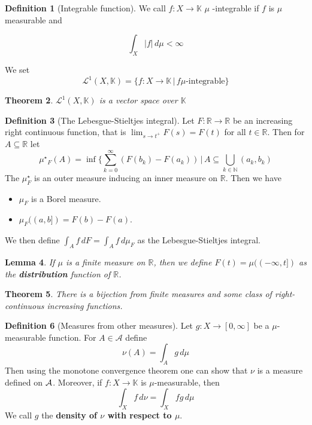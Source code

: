 \documentclass[10pt, oneside, reqno]{amsart}
\theoremstyle{plain}%
\newtheorem{thm}{Theorem}[section]
\newtheorem{lem}[thm]{Lemma}
\theoremstyle{definition}
\newtheorem{defn}[thm]{Definition}
\theoremstyle{remark}
\newcommand{\R}{\mathbb{R}}
\newcommand{\dmu}{\, d \mu}
\begin{document}
\begin{defn}[Integrable function]
	We call $f : X \rightarrow \mathbb{K}$ $\mu$ -integrable if $f$ is $\mu$ measurable and 
	
	\[
		\int_X |f| \, d \mu < \infty
	\]
	
	We set \[
		\mathcal{L}^1(X,\mathbb{K}) = \{ f : X \rightarrow \mathbb{K} \, | \, f \mu \text{-integrable} \}
	\]
\end{defn}

\begin{thm}
	$	\mathcal{L}^1(X,\mathbb{K})$ is a vector space over $\mathbb{K}$
\end{thm}


\begin{defn}[The Lebesgue-Stieltjes integral]
Let $F : \R \rightarrow \R$ be an increasing right continuous function, that is $\lim_{s \rightarrow t^+} F(s) = F(t)$ for all $t \in \R$.  Then for $A \subseteq \R$ let \[
	\mu{^\star}_F (A) = \inf \{ \sum_{k=0}^\infty (F(b_k) - F(a_k)) \, | \, A \subseteq \bigcup_{k \in \mathbb{N}} (a_k, b_k)
\]
The $\mu^\star_F$ is an outer measure inducing an inner measure on $\R$.  Then we have 
	\begin{itemize}
		\item $\mu_F$ is a Borel measure.
		\item $\mu_F((a,b]) = F(b) - F(a)$.
	\end{itemize}
	
	We then define $\int_A f \, dF = \int_A f \, d \mu_F $ as the Lebesgue-Stieltjes integral.
\end{defn}

\begin{lem}
	If $\mu$ is a finite measure on $\R$, then we define $F(t) = \mu((-\infty, t])$ as the \textbf{distribution} function of $\R$.
\end{lem}

\begin{thm}
	There is a bijection from finite measures and some class of right-continuous increasing functions.
\end{thm}

\begin{defn}[Measures from other measures]
	Let $g: X \rightarrow [0,\infty]$ be a $\mu$-measurable function.  For $A \in \mathcal{A}$ define \[
		\nu(A) = \int_A g \dmu
	\]  
Then using the monotone convergence theorem one can show that $\nu$ is a measure defined on $\mathcal{A}$.  Moreover, if $f: X \rightarrow \mathbb{K}$ is $\mu$-measurable, then \[
	\int_X f \, d \nu = \int_X fg \dmu
\]
We call $g$ the \textbf{density of $\nu$ with respect to $\mu$}.
\end{defn}
\end{document}
